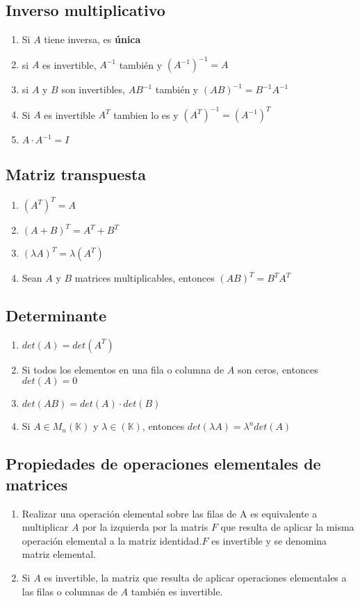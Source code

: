 \documentclass[]{article}
\begin{document}
\subsection{Inverso multiplicativo}
\begin{enumerate}
	\item Si $A$ tiene inversa, es \textbf{única}
	\item si $A$ es invertible, $A^{-1}$ también y $(A^{-1})^{-1}=A$
	\item si $A$ y $B$ son invertibles, $AB^{-1}$ también y $(AB)^{-1}=B^{-1}A^{-1}$
	\item Si $A$ es invertible $A^{T}$ tambien lo es y $(A^{T})^{-1}=(A^{-1})^{T}$
	\item $A \cdot A^{-1}=I$
\end{enumerate}



\subsection{Matriz transpuesta}
\begin{enumerate}
	\item $(A^{T})^{T}=A$
	\item $(A+B)^{T}=A^{T}+B^{T}$
	\item $(\lambda A)^{T}= \lambda (A^{T})$
	\item Sean $A$ y $B$ matrices multiplicables, entonces $(AB)^{T}=B^{T}A^{T}$
\end{enumerate}



\subsection{Determinante}
\begin{enumerate}
	\item $det(A)=det(A^{T})$
	\item Si todos los elementos en una fila o columna de $A$ son ceros, entonces $det(A)=0$
	\item $det(AB)=det(A) \cdot det(B)$
	\item Si $A \in M_{n}(\mathbb{K})$ y $\lambda \in (\mathbb{K})$, entonces $det(\lambda A)=\lambda^{n}det(A)$
\end{enumerate}



\subsection{Propiedades de operaciones elementales de matrices}
\begin{enumerate}
	\item Realizar una operación elemental sobre las filas de A es equivalente a multiplicar $A$ por la izquierda por la matris $F$ que resulta de aplicar la misma operación elemental a la matriz identidad.$F$ es invertible y se denomina matriz elemental.
	\item Si $A$ es invertible, la matriz que resulta de aplicar operaciones elementales a las filas o columnas de $A$ también es invertible.
\end{enumerate}
\end{document}
